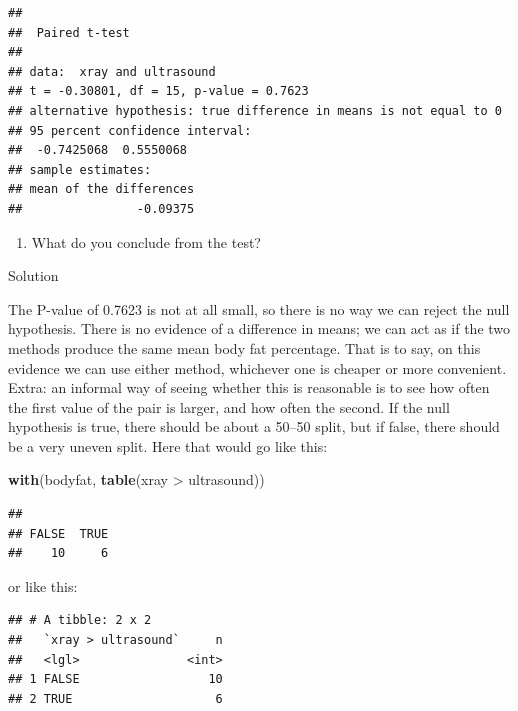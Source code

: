 \documentclass[]{tufte-book}
\newenvironment{Shaded}{}{}
\newcommand{\KeywordTok}[1]{\textcolor[rgb]{0.00,0.44,0.13}{\textbf{#1}}}
\newcommand{\NormalTok}[1]{#1}
\newcommand{\OperatorTok}[1]{\textcolor[rgb]{0.40,0.40,0.40}{#1}}
\newcommand{\StringTok}[1]{\textcolor[rgb]{0.25,0.44,0.63}{#1}}
\providecommand{\tightlist}{%
  \setlength{\itemsep}{0pt}\setlength{\parskip}{0pt}}
\theoremstyle{definition}
\theoremstyle{definition}
\theoremstyle{definition}
\theoremstyle{remark}
\begin{document}
\begin{verbatim}
## 
##  Paired t-test
## 
## data:  xray and ultrasound
## t = -0.30801, df = 15, p-value = 0.7623
## alternative hypothesis: true difference in means is not equal to 0
## 95 percent confidence interval:
##  -0.7425068  0.5550068
## sample estimates:
## mean of the differences 
##                -0.09375
\end{verbatim}

\begin{enumerate}
\def\labelenumi{(\alph{enumi})}
\setcounter{enumi}{3}
\tightlist
\item
  What do you conclude from the test?
\end{enumerate}

Solution

The P-value of 0.7623 is not at all small, so there is no way we can
reject the null hypothesis.  There
is no evidence of a difference in means; we can act as if the two
methods produce the same mean body fat percentage. That is to say, on
this evidence we can use either method, whichever one is cheaper or more
convenient. Extra: an informal way of seeing whether this is reasonable
is to see how often the first value of the pair is larger, and how often
the second. If the null hypothesis is true, there should be about a
50--50 split, but if false, there should be a very uneven split. Here
that would go like this:

\begin{Shaded}
\begin{Highlighting}[]
\KeywordTok{with}\NormalTok{(bodyfat, }\KeywordTok{table}\NormalTok{(xray }\OperatorTok{>}\StringTok{ }\NormalTok{ultrasound))}
\end{Highlighting}
\end{Shaded}

\begin{verbatim}
## 
## FALSE  TRUE 
##    10     6
\end{verbatim}

or like this:

\begin{Shaded}
\end{Shaded}

\begin{verbatim}
## # A tibble: 2 x 2
##   `xray > ultrasound`     n
##   <lgl>               <int>
## 1 FALSE                  10
## 2 TRUE                    6
\end{verbatim}
\end{document}

